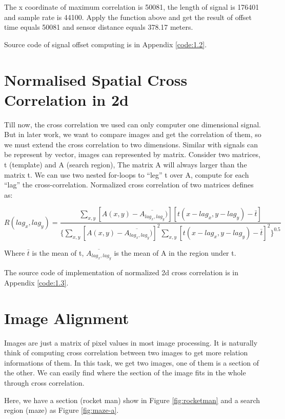 The x coordinate of maximum correlation is 50081, the length of signal is 176401 and sample rate is 44100. Apply the function above and get the result of offset time equals 50081 and sensor distance equals 378.17 meters.

Source code of signal offset computing is in Appendix \ref{code:1.2}.

\section{Normalised Spatial Cross Correlation in 2d}

Till now, the cross correlation we used can only computer one dimensional signal. But in later work, we want to compare images and get the correlation of them, so we must extend the cross correlation to two dimensions. Similar with signals can be represent by vector, images can represented by matrix. Consider two matrices, t (template) and A (search region), The matrix A will always larger than the matrix t. We can use two nested for-loops to ``leg'' t over A, compute for each ``lag'' the cross-correlation. Normalized cross correlation of two matrices defines as:

\begin{equation*}
R(lag_{x},lag_{y})=
\frac{\sum_{x,y}[A(x,y)-\overline{A_{lag_{x},lag_{y}}})][t(x-lag_{x},y-lag_{y})-\bar{t}]}
{\{\sum_{x,y}[A(x,y)-\overline{A_{lag_{x},lag_{y}}})]^2
	\sum_{x,y}[t(x-lag_{x},y-lag_{y})-\bar{t}]^2
	\}^{0.5}}
\end{equation*}

Where $\bar{t}$ is the mean of t, $\overline{A_{lag_{x},lag_{y}}}$ is the mean of A in the region under t. 

The source code of implementation of normalized 2d cross correlation is in Appendix \ref{code:1.3}.

\section{Image Alignment}

Images are just a matrix of pixel values in most image processing. It is naturally think of computing cross correlation between two images to get more relation informations of them. In this task, we get two images, one of them is a section of the other. We can easily find where the section of the image fits in the whole through cross correlation.

Here, we have a section (rocket man) show in Figure \ref{fig:rocketman} and a search region (maze) as Figure \ref{fig:maze-a}.

